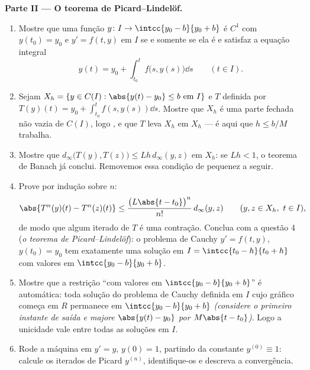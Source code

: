 \begin{problem}
\medskip
\noindent\textbf{Parte II --- O teorema de Picard--Lindelöf.}
\begin{enumerate}[resume]
  \item Mostre que uma função $y \colon I \to \intcc{y_0 - b}{y_0
        + b}$ é $C^1$ com $y(t_0) = y_0$ e $y' = f(t, y)$ em
        $I$ se e somente se ela é  e satisfaz a
        equação integral
        \[
        y(t) = y_0 + \int_{t_0}^{t} f\bigl(s, y(s)\bigr)\dd s
        \qquad (t \in I).
        \]
  \item Sejam $X_h = \{y \in C(I) : \abs{y(t) - y_0} \leq b
        \text{ em } I\}$ e $T$ definida por $T(y)(t) =
        y_0 + \int_{t_0}^{t}f(s, y(s))\dd s$. Mostre que $X_h$ é
        uma parte fechada não vazia de $C(I)$, logo , e
        que $T$ leva $X_h$ em $X_h$ --- é aqui que $h \leq
        b/M$ trabalha.
  \item Mostre que $d_\infty\bigl(T(y), T(z)\bigr) \leq
        Lh\,d_\infty(y, z)$ em $X_h$: se $Lh < 1$, o teorema de
        Banach já conclui. Removemos essa condição de pequenez
        a seguir.
  \item Prove por indução sobre $n$:
        \[
        \abs{T^n(y)(t) - T^n(z)(t)} \leq
        \frac{\bigl(L\abs{t - t_0}\bigr)^n}{n!}\,
        d_\infty(y, z) \qquad (y, z \in X_h,\ t \in I),
        \]
        de modo que algum iterado de $T$ é uma contração. Conclua com a
        questão 4 (\emph{o teorema de Picard--Lindelöf}): o
        problema de Cauchy $y' = f(t,y)$, $y(t_0) = y_0$ tem exatamente
        uma solução em $I = \intcc{t_0 - h}{t_0 + h}$ com
        valores em $\intcc{y_0 - b}{y_0 + b}$.
  \item Mostre que a restrição ``com valores em $\intcc{y_0 -
        b}{y_0 + b}$'' é automática: toda solução do problema de
        Cauchy definida em $I$ cujo gráfico começa em $R$ permanece
        em $\intcc{y_0 - b}{y_0 + b}$ \emph{(considere o primeiro
        instante de saída e majore $\abs{y(t) - y_0}$ por $M\abs{t -
        t_0}$)}. Logo a unicidade vale entre todas as soluções em
        $I$.
  \item Rode a máquina em $y' = y$, $y(0) = 1$, partindo da
        constante $y^{(0)} \equiv 1$: calcule os iterados
        de Picard $y^{(n)}$, identifique-os e descreva a
        convergência.
\end{enumerate}


\end{problem}
